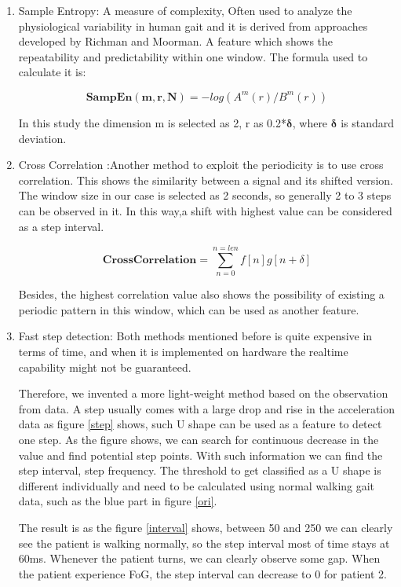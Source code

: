 \documentclass[article]{article}
\begin{document}
	\begin{enumerate}
		\item Sample Entropy: A measure of complexity, Often used to analyze the physiological variability in human gait and it is derived from approaches developed by Richman and Moorman\cite{sammpleE}. A feature which shows the repeatability and predictability within one window. The formula used to calculate it is:
    
		    \begin{equation}
		        \mathbf{SampEn(m,r,N)} = -log(A^m(r)/B^m(r))
		    \end{equation}
   
		   In this study the dimension m is selected as 2, r as 0.2*$\mathbf{\delta}$, where $\mathbf{\delta}$ is standard deviation. 
  
		
	\item Cross Correlation :Another method to exploit the periodicity is to use cross correlation. This shows the similarity between a signal and its shifted version. The window size in our case is selected as 2 seconds, so generally 2 to 3 steps can be observed in it. In this way,a shift with highest value can be considered as a step interval.
		
		\begin{equation}
		\mathbf{CrossCorrelation} = \sum_{n=0}^{n=len} f[n]g[n+\delta]
		\end{equation}
		
		Besides, the highest correlation value also shows the possibility of existing a periodic pattern in this window, which can be used as another feature.
		
		


	\item Fast step detection: Both methods mentioned before is quite expensive in terms of time, and when it is implemented on hardware the realtime capability might not be guaranteed. 
		
		Therefore, we invented a more light-weight method based on the observation from data. A step usually comes with a large drop and rise in the acceleration data as figure \ref{step} shows, such U shape can be used as a feature to detect one step. As the figure shows, we can search for continuous decrease in the value and find potential step points. With such information we can find the step interval, step frequency. The threshold to get classified as a U shape is different individually and need to be calculated using normal walking gait data, such as the blue part in figure \ref{ori}.
		
		The result is as the figure \ref{interval} shows, between 50 and 250 we can clearly see the patient is walking normally, so the step interval most of time stays at 60ms. Whenever the patient turns, we can clearly observe some gap. When the patient experience FoG, the step interval can decrease to 0 for patient 2.	

	\end{enumerate}
\end{document}
